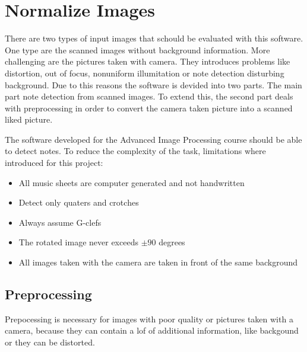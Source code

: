 \section{Normalize Images}
There are two types of input images that schould be evaluated with this software. One type are the scanned images without background information. More challenging are the pictures taken with camera. They introduces problems like distortion, out of focus, nonuniform illumitation or note detection disturbing background. Due to this reasons the software is devided into two parts. The main part note detection from scanned images. To extend this, the second part deals with preprocessing in order to convert the camera taken picture into a scanned liked picture. 

The software developed for the Advanced Image Processing course should be able to detect notes. To reduce the complexity of the task, limitations where introduced for this project: 

\begin{itemize}
\item All music sheets are computer generated and not handwritten 
\item Detect only quaters and crotches
\item Always assume G-clefs
\item The rotated image never exceeds $\pm 90$ degrees
\item All images taken with the camera are taken in front of the same background
\end{itemize}




\subsection{Preprocessing}
Prepocessing is necessary for images with poor quality or pictures taken with a camera, because they can contain a lof of additional information, like backgound or they can be distorted. 


